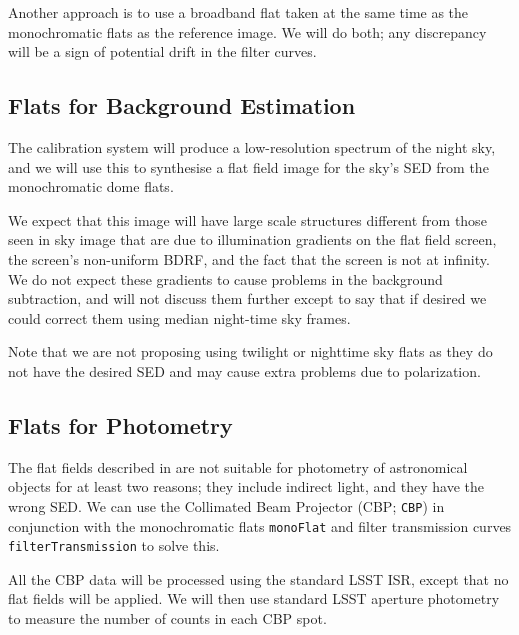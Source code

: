 \documentclass[DM,authoryear,toc,lsstdraft]{lsstdoc}
\newcommand{\inputData}[1]{\texttt{#1}}
\begin{document}
Another approach is to use a broadband flat taken at the same time as the monochromatic flats
as the reference image.  We will do both;  any discrepancy will be a sign of potential
drift in the filter curves.

\subsection{Flats for Background Estimation}
\label{backgroundFlats}

The calibration system will produce a low-resolution spectrum of the night sky,
and we will use this to synthesise a flat field image for the sky's SED from the monochromatic dome flats.

We expect that this image will have large scale structures different from those seen in sky image
that are due to illumination gradients on the flat field screen, the screen's non-uniform BDRF, and
the fact that the screen is not at infinity.  We do not expect these gradients to cause problems in
the background subtraction, and will not discuss them further except to say that if desired we could
correct them using median night-time sky frames.

Note that we are not proposing using twilight or nighttime sky flats as they do not have the desired
SED and may cause extra problems due to polarization.

\subsection{Flats for Photometry}

The flat fields described in  are not suitable for photometry of astronomical
objects for at least two reasons;  they include indirect light, and they have the wrong SED.  We can
use the Collimated Beam Projector (CBP; \inputData{CBP}) in conjunction with the monochromatic flats
\inputData{monoFlat} and filter transmission curves \inputData{filterTransmission} to solve this.

All the CBP data will be processed using the standard LSST ISR, except that no flat fields will be applied.
We will then use standard LSST aperture photometry to measure the number of counts in each CBP spot.
\end{document}
